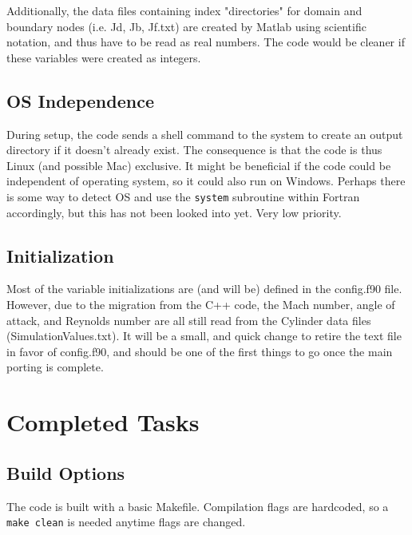 \documentclass[12pt]{article}
\begin{document}
    Additionally, the data files containing index "directories" for domain and boundary nodes (i.e. Jd, Jb, Jf.txt) are created by Matlab using scientific notation, and thus have to be read as real numbers. The code would be cleaner if these variables were created as integers.

    \subsection{OS Independence}
    During setup, the code sends a shell command to the system to create an output directory if it doesn't already exist. The consequence is that the code is thus Linux (and possible Mac) exclusive. It might be beneficial if the code could be independent of operating system, so it could also run on Windows. Perhaps there is some way to detect OS and use the \texttt{system} subroutine within Fortran accordingly, but this has not been looked into yet. Very low priority.

    \subsection{Initialization}
    Most of the variable initializations are (and will be) defined in the config.f90 file. However, due to the migration from the C++ code, the Mach number, angle of attack, and Reynolds number are all still read from the Cylinder data files (SimulationValues.txt). It will be a small, and quick change to retire the text file in favor of config.f90, and should be one of the first things to go once the main porting is complete.

    \newpage
    \section{Completed Tasks}

    \subsection{Build Options}
    The code is built with a basic Makefile. Compilation flags are hardcoded, so a \texttt{make clean} is needed anytime flags are changed.
\end{document}
